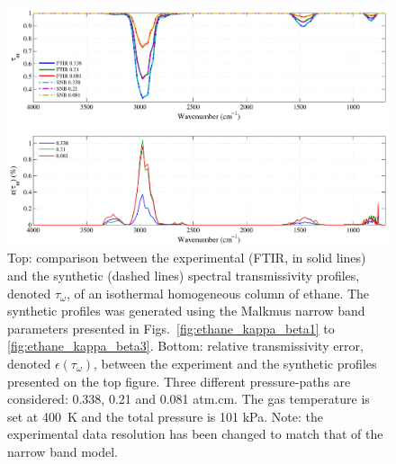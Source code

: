 \begin{figure}[p]
\includegraphics[width=\textwidth]{Figures/Comparison_Fit_Ethane_MALKMUS_Temp400K.pdf}
\caption{Top: comparison between the experimental (FTIR, in solid lines) and the synthetic (dashed lines) spectral transmissivity profiles, denoted $\tau_{\omega}$, of an isothermal homogeneous column of ethane. The synthetic profiles was generated using the Malkmus narrow band parameters presented in Figs.~\ref{fig:ethane_kappa_beta1} to \ref{fig:ethane_kappa_beta3}. Bottom: relative transmissivity error, denoted $\epsilon{(\tau_{\omega})}$, between the experiment and the synthetic profiles presented on the top figure. Three different pressure-paths are considered: 0.338, 0.21 and 0.081 atm.cm. The gas temperature is set at 400~K and the total pressure is 101 kPa. Note: the experimental data resolution has been changed to match that of the narrow band model. \label{fig:ethane_SNBVerify_400K}}
\end{figure}

